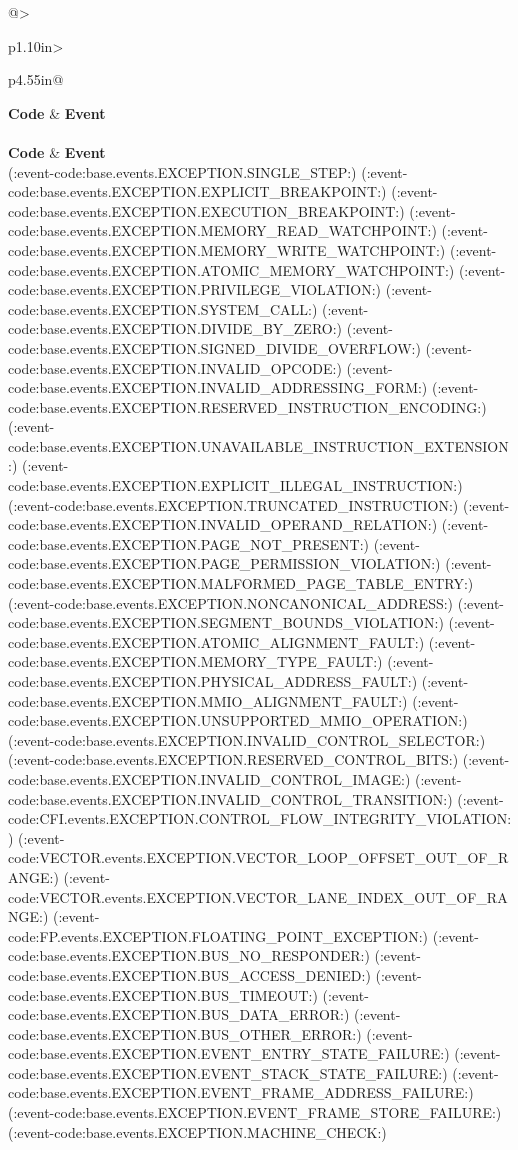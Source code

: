 \begin{BedrockLongTable}{@{}>{\raggedright\arraybackslash}p{1.10in}>{\raggedright\arraybackslash}p{4.55in}@{}}
\toprule
{}
\textbf{Code} & \textbf{Event}\\
\midrule
\endfirsthead
{}\\
\toprule
{}
\textbf{Code} & \textbf{Event}\\
\midrule
\endhead
(:event-code:base.events.EXCEPTION.SINGLE_STEP:)
(:event-code:base.events.EXCEPTION.EXPLICIT_BREAKPOINT:)
(:event-code:base.events.EXCEPTION.EXECUTION_BREAKPOINT:)
(:event-code:base.events.EXCEPTION.MEMORY_READ_WATCHPOINT:)
(:event-code:base.events.EXCEPTION.MEMORY_WRITE_WATCHPOINT:)
(:event-code:base.events.EXCEPTION.ATOMIC_MEMORY_WATCHPOINT:)
(:event-code:base.events.EXCEPTION.PRIVILEGE_VIOLATION:)
(:event-code:base.events.EXCEPTION.SYSTEM_CALL:)
(:event-code:base.events.EXCEPTION.DIVIDE_BY_ZERO:)
(:event-code:base.events.EXCEPTION.SIGNED_DIVIDE_OVERFLOW:)
(:event-code:base.events.EXCEPTION.INVALID_OPCODE:)
(:event-code:base.events.EXCEPTION.INVALID_ADDRESSING_FORM:)
(:event-code:base.events.EXCEPTION.RESERVED_INSTRUCTION_ENCODING:)
(:event-code:base.events.EXCEPTION.UNAVAILABLE_INSTRUCTION_EXTENSION:)
(:event-code:base.events.EXCEPTION.EXPLICIT_ILLEGAL_INSTRUCTION:)
(:event-code:base.events.EXCEPTION.TRUNCATED_INSTRUCTION:)
(:event-code:base.events.EXCEPTION.INVALID_OPERAND_RELATION:)
(:event-code:base.events.EXCEPTION.PAGE_NOT_PRESENT:)
(:event-code:base.events.EXCEPTION.PAGE_PERMISSION_VIOLATION:)
(:event-code:base.events.EXCEPTION.MALFORMED_PAGE_TABLE_ENTRY:)
(:event-code:base.events.EXCEPTION.NONCANONICAL_ADDRESS:)
(:event-code:base.events.EXCEPTION.SEGMENT_BOUNDS_VIOLATION:)
(:event-code:base.events.EXCEPTION.ATOMIC_ALIGNMENT_FAULT:)
(:event-code:base.events.EXCEPTION.MEMORY_TYPE_FAULT:)
(:event-code:base.events.EXCEPTION.PHYSICAL_ADDRESS_FAULT:)
(:event-code:base.events.EXCEPTION.MMIO_ALIGNMENT_FAULT:)
(:event-code:base.events.EXCEPTION.UNSUPPORTED_MMIO_OPERATION:)
(:event-code:base.events.EXCEPTION.INVALID_CONTROL_SELECTOR:)
(:event-code:base.events.EXCEPTION.RESERVED_CONTROL_BITS:)
(:event-code:base.events.EXCEPTION.INVALID_CONTROL_IMAGE:)
(:event-code:base.events.EXCEPTION.INVALID_CONTROL_TRANSITION:)
(:event-code:CFI.events.EXCEPTION.CONTROL_FLOW_INTEGRITY_VIOLATION:)
(:event-code:VECTOR.events.EXCEPTION.VECTOR_LOOP_OFFSET_OUT_OF_RANGE:)
(:event-code:VECTOR.events.EXCEPTION.VECTOR_LANE_INDEX_OUT_OF_RANGE:)
(:event-code:FP.events.EXCEPTION.FLOATING_POINT_EXCEPTION:)
(:event-code:base.events.EXCEPTION.BUS_NO_RESPONDER:)
(:event-code:base.events.EXCEPTION.BUS_ACCESS_DENIED:)
(:event-code:base.events.EXCEPTION.BUS_TIMEOUT:)
(:event-code:base.events.EXCEPTION.BUS_DATA_ERROR:)
(:event-code:base.events.EXCEPTION.BUS_OTHER_ERROR:)
(:event-code:base.events.EXCEPTION.EVENT_ENTRY_STATE_FAILURE:)
(:event-code:base.events.EXCEPTION.EVENT_STACK_STATE_FAILURE:)
(:event-code:base.events.EXCEPTION.EVENT_FRAME_ADDRESS_FAILURE:)
(:event-code:base.events.EXCEPTION.EVENT_FRAME_STORE_FAILURE:)
(:event-code:base.events.EXCEPTION.MACHINE_CHECK:)
\bottomrule
\end{BedrockLongTable}

